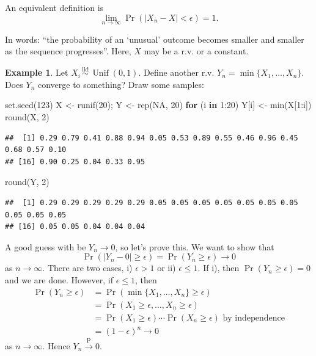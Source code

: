 \documentclass[
]{book}
\newenvironment{Shaded}{\begin{snugshade}}{\end{snugshade}}
\newcommand{\ConstantTok}[1]{\textcolor[rgb]{0.00,0.00,0.00}{#1}}
\newcommand{\ControlFlowTok}[1]{\textcolor[rgb]{0.13,0.29,0.53}{\textbf{#1}}}
\newcommand{\DecValTok}[1]{\textcolor[rgb]{0.00,0.00,0.81}{#1}}
\newcommand{\FunctionTok}[1]{\textcolor[rgb]{0.00,0.00,0.00}{#1}}
\newcommand{\NormalTok}[1]{#1}
\newcommand{\OtherTok}[1]{\textcolor[rgb]{0.56,0.35,0.01}{#1}}
\newcommand{\SpecialCharTok}[1]{\textcolor[rgb]{0.00,0.00,0.00}{#1}}
\DeclareMathOperator{\Unif}{Unif}
\newcommand{\iid}{\,\overset{\text{iid}}{\sim}\,}
\theoremstyle{definition}
\theoremstyle{definition}
\newtheorem{example}{Example}[chapter]
\theoremstyle{definition}
\theoremstyle{definition}
\theoremstyle{remark}
\begin{document}
An equivalent definition is
\[
  \lim_{n\to\infty}\Pr(|X_n-X| < \epsilon)  = 1.
\]

In words: ``the probability of an `unusual' outcome becomes smaller and smaller as the sequence progresses''.
Here, \(X\) may be a r.v. or a constant.

\begin{example}
Let \(X_i\iid \Unif(0,1)\). Define another r.v. \(Y_n=\min\{X_1,\dots,X_n\}\). Does \(Y_n\) converge to something? Draw some samples:

\begin{Shaded}
\begin{Highlighting}[]
\FunctionTok{set.seed}\NormalTok{(}\DecValTok{123}\NormalTok{)}
\NormalTok{X }\OtherTok{\textless{}{-}} \FunctionTok{runif}\NormalTok{(}\DecValTok{20}\NormalTok{); Y }\OtherTok{\textless{}{-}} \FunctionTok{rep}\NormalTok{(}\ConstantTok{NA}\NormalTok{, }\DecValTok{20}\NormalTok{)}
\ControlFlowTok{for}\NormalTok{ (i }\ControlFlowTok{in} \DecValTok{1}\SpecialCharTok{:}\DecValTok{20}\NormalTok{) Y[i] }\OtherTok{\textless{}{-}} \FunctionTok{min}\NormalTok{(X[}\DecValTok{1}\SpecialCharTok{:}\NormalTok{i]) }
\FunctionTok{round}\NormalTok{(X, }\DecValTok{2}\NormalTok{)}
\end{Highlighting}
\end{Shaded}

\begin{verbatim}
##  [1] 0.29 0.79 0.41 0.88 0.94 0.05 0.53 0.89 0.55 0.46 0.96 0.45 0.68 0.57 0.10
## [16] 0.90 0.25 0.04 0.33 0.95
\end{verbatim}

\begin{Shaded}
\begin{Highlighting}[]
\FunctionTok{round}\NormalTok{(Y, }\DecValTok{2}\NormalTok{)}
\end{Highlighting}
\end{Shaded}

\begin{verbatim}
##  [1] 0.29 0.29 0.29 0.29 0.29 0.05 0.05 0.05 0.05 0.05 0.05 0.05 0.05 0.05 0.05
## [16] 0.05 0.05 0.04 0.04 0.04
\end{verbatim}

A good guess with be \(Y_n \to 0\), so let's prove this.
We want to show that
\[\Pr(|Y_n-0| \geq \epsilon)=\Pr(Y_n\geq \epsilon)\to 0\]
as \(n\to \infty\). There are two cases, i) \(\epsilon > 1\) or ii) \(\epsilon \leq 1\). If i), then \(\Pr(Y_n\geq \epsilon)=0\) and we are done. However, if \(\epsilon \leq 1\), then
\[
\begin{aligned}
\Pr(Y_n\geq \epsilon) 
&= \Pr(\min\{X_1,\dots,X_n\} \geq \epsilon) \\
&=\Pr(X_1 \geq \epsilon, \dots, X_n \geq \epsilon) \\
&=\Pr(X_1\geq \epsilon)\cdots \Pr(X_n\geq \epsilon) \text{ by independence}\\
&=(1-\epsilon)^n \to 0
\end{aligned}
\]
as \(n\to \infty\). Hence \(Y_n \xrightarrow{\text{P}} 0\).
\end{example}
\end{document}
